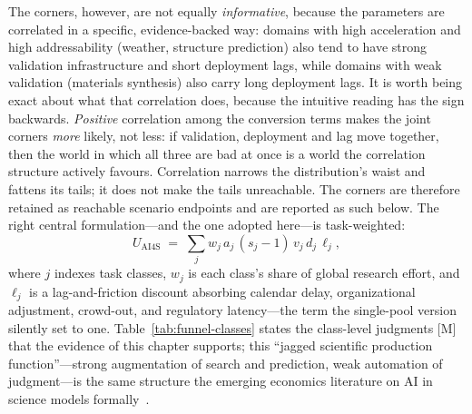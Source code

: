 The corners, however, are not equally \emph{informative}, because the parameters are correlated in a specific, evidence-backed way: domains with high acceleration and high addressability (weather, structure prediction) also tend to have strong validation infrastructure and short deployment lags, while domains with weak validation (materials synthesis) also carry long deployment lags. It is worth being exact about what that correlation does, because the intuitive reading has the sign backwards. \emph{Positive} correlation among the conversion terms makes the joint corners \emph{more} likely, not less: if validation, deployment and lag move together, then the world in which all three are bad at once is a world the correlation structure actively favours. Correlation narrows the distribution's waist and fattens its tails; it does not make the tails unreachable. The corners are therefore retained as reachable scenario endpoints and are reported as such below. The right central formulation---and the one adopted here---is task-weighted:
\begin{equation}
U_{\mathrm{AI4S}} \;=\; \sum_j w_j\, a_j\,(s_j - 1)\, v_j\, d_j\, \ell_j,
\label{eq:funnel-weighted}
\end{equation}
where $j$ indexes task classes, $w_j$ is each class's share of global research effort, and $\ell_j$ is a lag-and-friction discount absorbing calendar delay, organizational adjustment, crowd-out, and regulatory latency---the term the single-pool version silently set to one. Table~\ref{tab:funnel-classes} states the class-level judgments [M] that the evidence of this chapter supports; this ``jagged scientific production function''---strong augmentation of search and prediction, weak automation of judgment---is the same structure the emerging economics literature on AI in science models formally~\cite{agrawal2026}.

